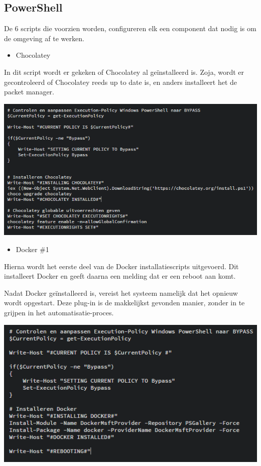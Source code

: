 \subsection{PowerShell}
De 6 scripts die voorzien worden, configureren elk een component dat nodig is om de omgeving af te werken.

\begin{itemize}[noitemsep]
	\item Chocolatey
\end{itemize}

In dit script wordt er gekeken of Chocolatey al geïnstalleerd is. Zoja, wordt er gecontroleerd of Chocolatey reeds up to date is, en anders installeert het de packet manager.

\begin{center}
	\includegraphics[scale=0.6]{img/chocolatey}
\end{center}

\begin{itemize}[noitemsep]
	\item Docker \#1
\end{itemize}

Hierna wordt het eerste deel van de Docker installatiescripts uitgevoerd. Dit installeert Docker en geeft daarna een melding dat er een reboot aan komt.

Nadat Docker geïnstalleerd is, vereist het systeem namelijk dat het opnieuw wordt opgestart. Deze plug-in is de makkelijkst gevonden manier, zonder in te grijpen in het automatisatie-proces.

\begin{center}
	\includegraphics[scale=0.6]{img/docker01}
\end{center}

